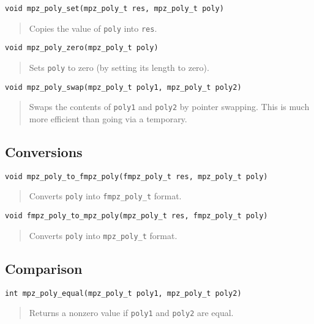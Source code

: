 \documentclass[a4paper,10pt]{article}
\newcommand{\code}{\lstinline}
\begin{document}
\begin{lstlisting}
void mpz_poly_set(mpz_poly_t res, mpz_poly_t poly)
\end{lstlisting}
\begin{quote}
Copies the value of \code{poly} into \code{res}.
\end{quote}

\begin{lstlisting}
void mpz_poly_zero(mpz_poly_t poly)
\end{lstlisting}
\begin{quote}
Sets \code{poly} to zero (by setting its length to zero).
\end{quote}

\begin{lstlisting}
void mpz_poly_swap(mpz_poly_t poly1, mpz_poly_t poly2)
\end{lstlisting}
\begin{quote}
Swaps the contents of \code{poly1} and \code{poly2} by pointer swapping. This is much more efficient than going via a temporary.
\end{quote}


\subsection{Conversions}

\begin{lstlisting}
void mpz_poly_to_fmpz_poly(fmpz_poly_t res, mpz_poly_t poly)
\end{lstlisting}
\begin{quote}
Converts \code{poly} into \code{fmpz_poly_t} format.
\end{quote}

\begin{lstlisting}
void fmpz_poly_to_mpz_poly(mpz_poly_t res, fmpz_poly_t poly)
\end{lstlisting}
\begin{quote}
Converts \code{poly} into \code{mpz_poly_t} format.
\end{quote}



\subsection{Comparison}


\begin{lstlisting}
int mpz_poly_equal(mpz_poly_t poly1, mpz_poly_t poly2)
\end{lstlisting}
\begin{quote}
Returns a nonzero value if \code{poly1} and \code{poly2} are equal.
\end{quote}
\end{document}
